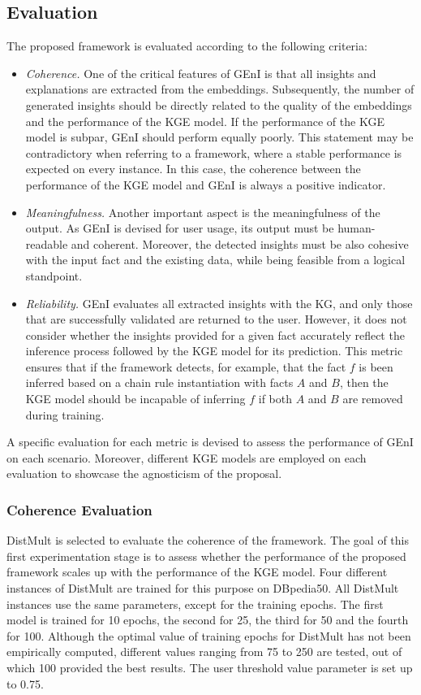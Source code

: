 \subsection{Evaluation}\label{6_sec:subsec:geni_evaluation}
The proposed framework is evaluated according to the following criteria:
\begin{itemize}
    \item \textit{Coherence.} One of the critical features of GEnI is that all insights and explanations are extracted from the embeddings. Subsequently, the number of generated insights should be directly related to the quality of the embeddings and the performance of the KGE model. If the performance of the KGE model is subpar, GEnI should perform equally poorly. This statement may be contradictory when referring to a framework, where a stable performance is expected on every instance. In this case, the coherence between the performance of the KGE model and GEnI is always a positive indicator.
    
    \item \textit{Meaningfulness.} Another important aspect is the meaningfulness of the output. As GEnI is devised for user usage, its output must be human-readable and coherent. Moreover, the detected insights must be also cohesive with the input fact and the existing data, while being feasible from a logical standpoint.
    
    \item \textit{Reliability.} GEnI evaluates all extracted insights with the KG, and only those that are successfully validated are returned to the user. However, it does not consider whether the insights provided for a given fact accurately reflect the inference process followed by the KGE model for its prediction. This metric ensures that if the framework detects, for example, that the fact $f$ is been inferred based on a chain rule instantiation with facts $A$ and $B$, then the KGE model should be incapable of inferring $f$ if both $A$ and $B$ are removed during training.
\end{itemize}

A specific evaluation for each metric is devised to assess the performance of GEnI on each scenario. Moreover, different KGE models are employed on each evaluation to showcase the agnosticism of the proposal.

\subsubsection{Coherence Evaluation}
DistMult is selected to evaluate the coherence of the framework. The goal of this first experimentation stage is to assess whether the performance of the proposed framework scales up with the performance of the KGE model. Four different instances of DistMult are trained for this purpose on DBpedia50. All DistMult instances use the same parameters, except for the training epochs. The first model is trained for 10 epochs, the second for 25, the third for 50 and the fourth for 100. Although the optimal value of training epochs for DistMult has not been empirically computed, different values ranging from 75 to 250 are tested, out of which 100 provided the best results. The user threshold value parameter is set up to 0.75. 

